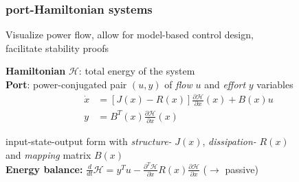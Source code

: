 \documentclass[student]{ITRslides}
\begin{document}
\begin{frame}
	\frametitle{port-Hamiltonian systems}
	\begin{block}{}
	Visualize power flow, allow for model-based control design,\\ facilitate stability proofs
	\end{block}	
	\textbf{Hamiltonian} $\mathcal{H}$: total energy of the system\\
		\textbf{Port}: power-conjugated pair $(u,y)$ of \emph{flow} $u$ and \emph{effort} $y$ variables\\
	\begin{align*}
		 \dot{x} &= \left[J(x)-R(x)\right]\frac{\partial \mathcal{H}}{\partial x}(x) +B(x)u \\
y &= B^T(x)\frac{\partial \mathcal{H}}{\partial x}(x)
	\end{align*}

	input-state-output form with \emph{structure-} $J(x)$, \emph{dissipation-} $R(x)$\\ and \emph{mapping }matrix $B(x)$ \\

	\textbf{Energy balance:}  $ \frac{d}{dt}\mathcal{H} = y^Tu - \frac{\partial^T \mathcal{H}}{\partial x}R(x)\frac{\partial \mathcal{H}}{\partial x} $ ($\rightarrow$ passive)
	
	

%	
		

\end{frame}
\end{document}
